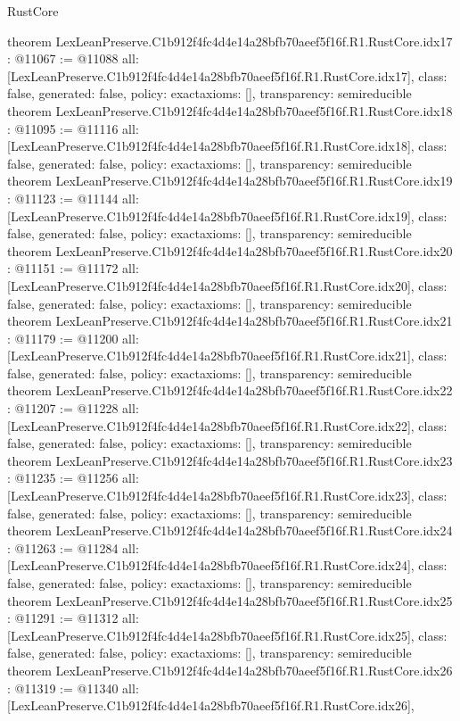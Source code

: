 \begin{lexlean}{RustCore}
\begin{coremodule}
{}
theorem LexLeanPreserve.C1b912f4fc4d4e14a28bfb70aeef5f16f.R1.RustCore.idx17 : @11067 := @11088 {
  all: [LexLeanPreserve.C1b912f4fc4d4e14a28bfb70aeef5f16f.R1.RustCore.idx17],
  class: false,
  generated: false,
  policy: exact{axioms: []},
  transparency: semireducible
}
theorem LexLeanPreserve.C1b912f4fc4d4e14a28bfb70aeef5f16f.R1.RustCore.idx18 : @11095 := @11116 {
  all: [LexLeanPreserve.C1b912f4fc4d4e14a28bfb70aeef5f16f.R1.RustCore.idx18],
  class: false,
  generated: false,
  policy: exact{axioms: []},
  transparency: semireducible
}
theorem LexLeanPreserve.C1b912f4fc4d4e14a28bfb70aeef5f16f.R1.RustCore.idx19 : @11123 := @11144 {
  all: [LexLeanPreserve.C1b912f4fc4d4e14a28bfb70aeef5f16f.R1.RustCore.idx19],
  class: false,
  generated: false,
  policy: exact{axioms: []},
  transparency: semireducible
}
theorem LexLeanPreserve.C1b912f4fc4d4e14a28bfb70aeef5f16f.R1.RustCore.idx20 : @11151 := @11172 {
  all: [LexLeanPreserve.C1b912f4fc4d4e14a28bfb70aeef5f16f.R1.RustCore.idx20],
  class: false,
  generated: false,
  policy: exact{axioms: []},
  transparency: semireducible
}
theorem LexLeanPreserve.C1b912f4fc4d4e14a28bfb70aeef5f16f.R1.RustCore.idx21 : @11179 := @11200 {
  all: [LexLeanPreserve.C1b912f4fc4d4e14a28bfb70aeef5f16f.R1.RustCore.idx21],
  class: false,
  generated: false,
  policy: exact{axioms: []},
  transparency: semireducible
}
theorem LexLeanPreserve.C1b912f4fc4d4e14a28bfb70aeef5f16f.R1.RustCore.idx22 : @11207 := @11228 {
  all: [LexLeanPreserve.C1b912f4fc4d4e14a28bfb70aeef5f16f.R1.RustCore.idx22],
  class: false,
  generated: false,
  policy: exact{axioms: []},
  transparency: semireducible
}
theorem LexLeanPreserve.C1b912f4fc4d4e14a28bfb70aeef5f16f.R1.RustCore.idx23 : @11235 := @11256 {
  all: [LexLeanPreserve.C1b912f4fc4d4e14a28bfb70aeef5f16f.R1.RustCore.idx23],
  class: false,
  generated: false,
  policy: exact{axioms: []},
  transparency: semireducible
}
theorem LexLeanPreserve.C1b912f4fc4d4e14a28bfb70aeef5f16f.R1.RustCore.idx24 : @11263 := @11284 {
  all: [LexLeanPreserve.C1b912f4fc4d4e14a28bfb70aeef5f16f.R1.RustCore.idx24],
  class: false,
  generated: false,
  policy: exact{axioms: []},
  transparency: semireducible
}
theorem LexLeanPreserve.C1b912f4fc4d4e14a28bfb70aeef5f16f.R1.RustCore.idx25 : @11291 := @11312 {
  all: [LexLeanPreserve.C1b912f4fc4d4e14a28bfb70aeef5f16f.R1.RustCore.idx25],
  class: false,
  generated: false,
  policy: exact{axioms: []},
  transparency: semireducible
}
theorem LexLeanPreserve.C1b912f4fc4d4e14a28bfb70aeef5f16f.R1.RustCore.idx26 : @11319 := @11340 {
  all: [LexLeanPreserve.C1b912f4fc4d4e14a28bfb70aeef5f16f.R1.RustCore.idx26],
}
\end{coremodule}
\end{lexlean}
